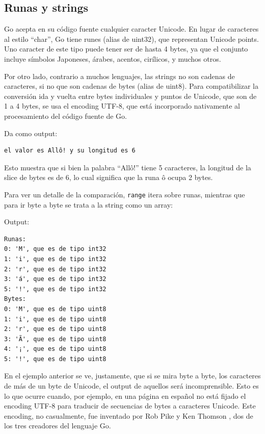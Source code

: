\documentclass{article}
\begin{document}
\subsection{Runas y strings}
Go acepta en su código fuente cualquier caracter Unicode. En lugar de caracteres al estilo ``char'', Go tiene runes (alias de uint32), que representan Unicode points. Uno caracter de este tipo puede tener ser de hasta 4 bytes, ya que el conjunto incluye símbolos Japoneses, árabes, acentos, cirílicos, y muchos otros.

Por otro lado, contrario a muchos lenguajes, las strings no son cadenas de caracteres, si no que son cadenas de bytes (alias de uint8). Para compatibilizar la conversión ida y vuelta entre bytes individuales y puntos de Unicode, que son de 1 a 4 bytes, se usa el encoding UTF-8, que está incorporado nativamente al procesamiento del código fuente de Go.

Da como output:
\begin{verbatim}
el valor es Allô! y su longitud es 6
\end{verbatim}
Esto muestra que si bien la palabra ``Allô!'' tiene 5 caracteres, la longitud de la slice de bytes es de 6, lo cual significa que la runa ô ocupa 2 bytes. 

Para ver un detalle de la comparación, \lstinline|range| itera sobre runas, mientras que para ir byte a byte se trata a la string como un array: 

Output:
\begin{verbatim}
Runas:
0: 'M', que es de tipo int32
1: 'i', que es de tipo int32
2: 'r', que es de tipo int32
3: 'á', que es de tipo int32
5: '!', que es de tipo int32
Bytes:
0: 'M', que es de tipo uint8
1: 'i', que es de tipo uint8
2: 'r', que es de tipo uint8
3: 'Ã', que es de tipo uint8
4: '¡', que es de tipo uint8
5: '!', que es de tipo uint8
\end{verbatim}
En el ejemplo anterior se ve, justamente, que si se mira byte a byte, los caracteres de más de un byte de Unicode, el output de aquellos será incomprensible. Esto es lo que ocurre cuando, por ejemplo, en una página en español no está fijado el encoding UTF-8 para traducir de secuencias de bytes a caracteres Unicode. Este encoding, no casualmente, fue inventado por Rob Pike y Ken Thomson \cite{unicode}, dos de los tres creadores del lenguaje Go.
\end{document}
